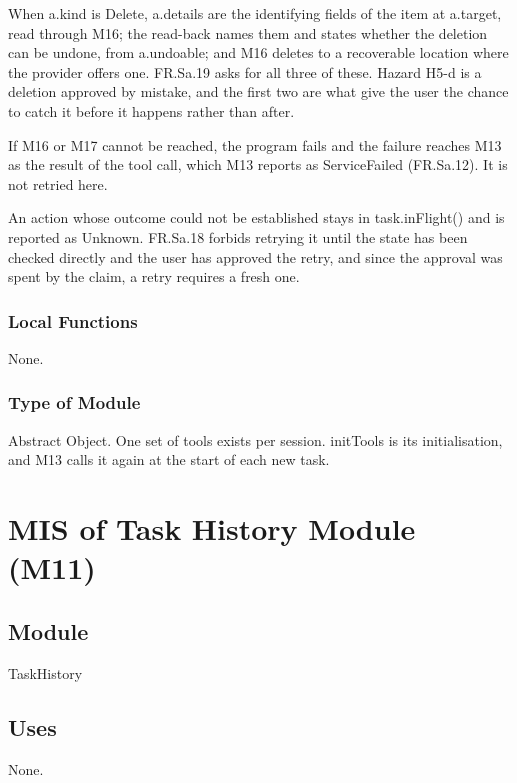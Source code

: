 \documentclass[12pt, titlepage]{article}
\begin{document}
\noindent When a.kind is Delete, a.details are the identifying fields of the
item at a.target, read through M16; the read-back names them and states whether
the deletion can be undone, from a.undoable; and M16 deletes to a
recoverable location where the provider offers one. FR.Sa.19 asks for all three
of these. Hazard H5-d is a deletion approved by mistake, and the first two are
what give the user the chance to catch it before it happens rather than after.

\noindent If M16 or M17 cannot be reached, the program fails and the failure
reaches M13 as the result of the tool call, which M13 reports as ServiceFailed
(FR.Sa.12). It is not retried here.

\noindent An action whose outcome could not be established stays in
task.inFlight() and is reported as Unknown. FR.Sa.18 forbids retrying it until
the state has been checked directly and the user has approved the retry, and
since the approval was spent by the claim, a retry requires a fresh one.

\subsubsection{Local Functions}

None.

\subsubsection{Type of Module}

Abstract Object. One set of tools exists per session. initTools is its
initialisation, and M13 calls it again at the start of each new task.

\newpage

\section{MIS of Task History Module (M11)} \label{mod:hist}

\subsection{Module}

TaskHistory

\subsection{Uses}

None.
\end{document}
